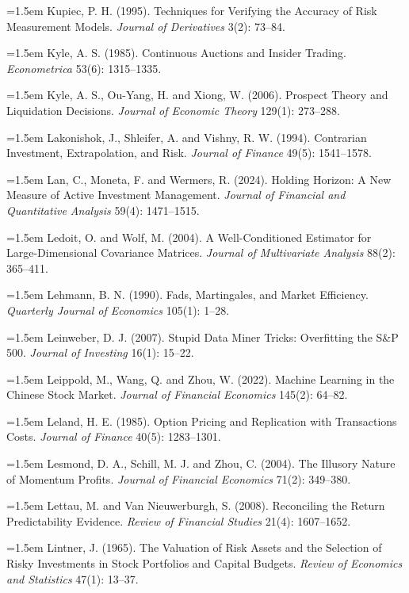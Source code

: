 \hangindent=1.5em Kupiec, P. H. (1995). Techniques for Verifying the Accuracy of Risk Measurement Models. \emph{Journal of Derivatives} 3(2): 73--84.

\hangindent=1.5em Kyle, A. S. (1985). Continuous Auctions and Insider Trading. \emph{Econometrica} 53(6): 1315--1335.

\hangindent=1.5em Kyle, A. S., Ou-Yang, H. and Xiong, W. (2006). Prospect Theory and Liquidation Decisions. \emph{Journal of Economic Theory} 129(1): 273--288.

\hangindent=1.5em Lakonishok, J., Shleifer, A. and Vishny, R. W. (1994). Contrarian Investment, Extrapolation, and Risk. \emph{Journal of Finance} 49(5): 1541--1578.

\hangindent=1.5em Lan, C., Moneta, F. and Wermers, R. (2024). Holding Horizon: A New Measure of Active Investment Management. \emph{Journal of Financial and Quantitative Analysis} 59(4): 1471--1515.

\hangindent=1.5em Ledoit, O. and Wolf, M. (2004). A Well-Conditioned Estimator for Large-Dimensional Covariance Matrices. \emph{Journal of Multivariate Analysis} 88(2): 365--411.

\hangindent=1.5em Lehmann, B. N. (1990). Fads, Martingales, and Market Efficiency. \emph{Quarterly Journal of Economics} 105(1): 1--28.

\hangindent=1.5em Leinweber, D. J. (2007). Stupid Data Miner Tricks: Overfitting the S\&P 500. \emph{Journal of Investing} 16(1): 15--22.

\hangindent=1.5em Leippold, M., Wang, Q. and Zhou, W. (2022). Machine Learning in the Chinese Stock Market. \emph{Journal of Financial Economics} 145(2): 64--82.

\hangindent=1.5em Leland, H. E. (1985). Option Pricing and Replication with Transactions Costs. \emph{Journal of Finance} 40(5): 1283--1301.

\hangindent=1.5em Lesmond, D. A., Schill, M. J. and Zhou, C. (2004). The Illusory Nature of Momentum Profits. \emph{Journal of Financial Economics} 71(2): 349--380.

\hangindent=1.5em Lettau, M. and Van Nieuwerburgh, S. (2008). Reconciling the Return Predictability Evidence. \emph{Review of Financial Studies} 21(4): 1607--1652.

\hangindent=1.5em Lintner, J. (1965). The Valuation of Risk Assets and the Selection of Risky Investments in Stock Portfolios and Capital Budgets. \emph{Review of Economics and Statistics} 47(1): 13--37.

